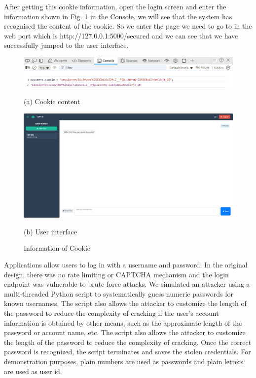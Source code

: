 \documentclass{article}
\begin{document}
After getting this cookie information, open the login screen and enter the information shown in Fig. \ref{fig:cookie} in the Console, we will see that the system has recognised the content of the cookie. 
So we enter the page we need to go to in the web port which is http://127.0.0.1:5000/secured and we can see that we have successfully jumped to the user interface.
\begin{figure}[htb]
    \begin{minipage}{0.5\textwidth}
        \centering
        \includegraphics[width=\textwidth]{images/cookie_content.png}
        \caption*{(a) Cookie content}
    \end{minipage}
    \hfill
    \begin{minipage}{0.5\textwidth}
        \centering
        \includegraphics[width=\textwidth]{images/user_interface.png}
        \caption*{(b) User interface}
    \end{minipage}
    \caption{Information of Cookie}
    \label{fig:cookie}
\end{figure}

Applications allow users to log in with a username and password. In the original design, there was no rate limiting or CAPTCHA mechanism and the login endpoint was vulnerable to brute force attacks. We simulated an attacker using a multi-threaded Python script to systematically guess numeric passwords for known usernames. The script also allows the attacker to customize the length of the password to reduce the complexity of cracking if the user's account information is obtained by other means, such as the approximate length of the password or account name, etc. The script also allows the attacker to customize the length of the password to reduce the complexity of cracking. Once the correct password is recognized, the script terminates and saves the stolen credentials. For demonstration purposes, plain numbers are used as passwords and plain letters are used as user id.
\end{document}
